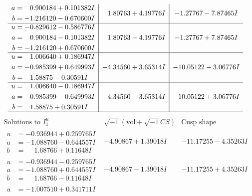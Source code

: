 \documentclass[1p]{elsarticle_modified}
\theoremstyle{definition}
\newcommand{\I}{\sqrt{-1}}
\begin{document}
$$\begin{array}{c|c|c}
\begin{aligned}
a &= \phantom{-}0.900184 + 0.101382 I \\
b &= -1.216120 - 0.670600 I\end{aligned}
 & \phantom{-}1.80763 + 4.19776 I & -1.27767 - 7.87465 I \\ \hline\begin{aligned}
u &= -0.829612 - 0.586776 I \\
a &= \phantom{-}0.900184 - 0.101382 I \\
b &= -1.216120 + 0.670600 I\end{aligned}
 & \phantom{-}1.80763 - 4.19776 I & -1.27767 + 7.87465 I \\ \hline\begin{aligned}
u &= \phantom{-}1.006640 + 0.186947 I \\
a &= -0.985399 + 0.649993 I \\
b &= \phantom{-}1.58875 - 0.30591 I\end{aligned}
 & -4.34560 + 3.65314 I & -10.05122 - 3.06776 I \\ \hline\begin{aligned}
u &= \phantom{-}1.006640 - 0.186947 I \\
a &= -0.985399 - 0.649993 I \\
b &= \phantom{-}1.58875 + 0.30591 I\end{aligned}
 & -4.34560 - 3.65314 I & -10.05122 + 3.06776 I\\
 \hline 
 \end{array}$$\newpage$$\begin{array}{c|c|c}  
\text{Solutions to }I^u_{1}& \I (\text{vol} + \sqrt{-1}CS) & \text{Cusp shape}\\
 \hline 
\begin{aligned}
u &= -0.936944 + 0.259765 I \\
a &= -1.088760 - 0.644557 I \\
b &= \phantom{-}1.68766 + 0.11648 I\end{aligned}
 & -4.90867 + 1.39018 I & -11.17255 - 4.35263 I \\ \hline\begin{aligned}
u &= -0.936944 - 0.259765 I \\
a &= -1.088760 + 0.644557 I \\
b &= \phantom{-}1.68766 - 0.11648 I\end{aligned}
 & -4.90867 - 1.39018 I & -11.17255 + 4.35263 I \\ \hline\begin{aligned}
u &= -1.007510 + 0.341711 I \\

\end{aligned}
\end{array}$$
\end{document}
